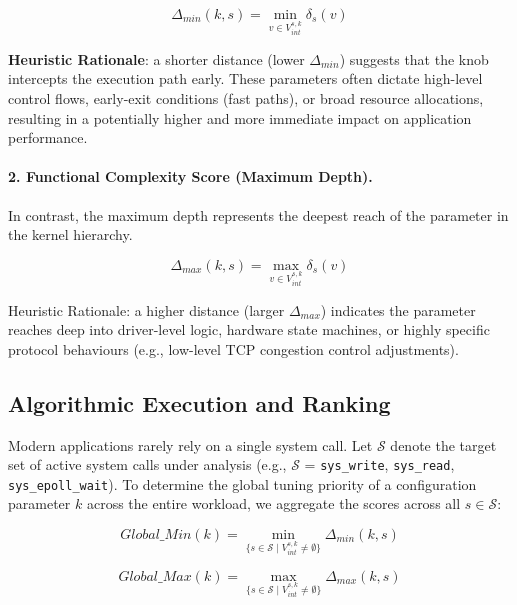\[\Delta_{min}(k,s) = \min_{v \in V_{int}^{s,k}} \delta_s(v)\]

\textbf{Heuristic Rationale}: a shorter distance (lower $\Delta_{min}$) suggests that the knob intercepts the execution path early.
These parameters often dictate high-level control flows, early-exit conditions (fast paths), or broad resource allocations, resulting in a potentially higher and more immediate impact on application performance.

\paragraph{2. Functional Complexity Score (Maximum Depth).}
In contrast, the maximum depth represents the deepest reach of the parameter in the kernel hierarchy.

\[\Delta_{max}(k,s) = \max_{v \in V_{int}^{s,k}} \delta_s(v)\]

Heuristic Rationale: a higher distance (larger $\Delta_{max}$) indicates the parameter reaches deep into driver-level logic, hardware state machines, or highly specific protocol behaviours (e.g., low-level TCP congestion control adjustments).

\subsection{Algorithmic Execution and Ranking}

Modern applications rarely rely on a single system call.
Let $\mathcal{S}$ denote the target set of active system calls under analysis (e.g., $\mathcal{S}$ = {\texttt{sys\_write}, \texttt{sys\_read}, \texttt{sys\_epoll\_wait}}).
To determine the global tuning priority of a configuration parameter $k$ across the entire workload, we aggregate the scores across all $s \in \mathcal{S}$:

\[Global\_Min(k) = \min_{\{s \in \mathcal{S} \mid V_{int}^{s,k} \neq \emptyset\}} \Delta_{min}(k,s)\]

\[Global\_Max(k) = \max_{\{s \in \mathcal{S} \mid V_{int}^{s,k} \neq \emptyset\}} \Delta_{max}(k,s)\]

